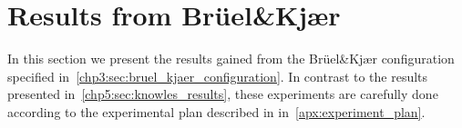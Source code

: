 \section{Results from Brüel\&Kjær}\label{chp5:sec:bk_results}
In this section we present the results gained from the Brüel\&Kjær configuration specified in~\autoref{chp3:sec:bruel_kjaer_configuration}. 
In contrast to the results presented in~\autoref{chp5:sec:knowles_results}, these experiments are carefully done according to the experimental plan described in in~\autoref{apx:experiment_plan}. 


